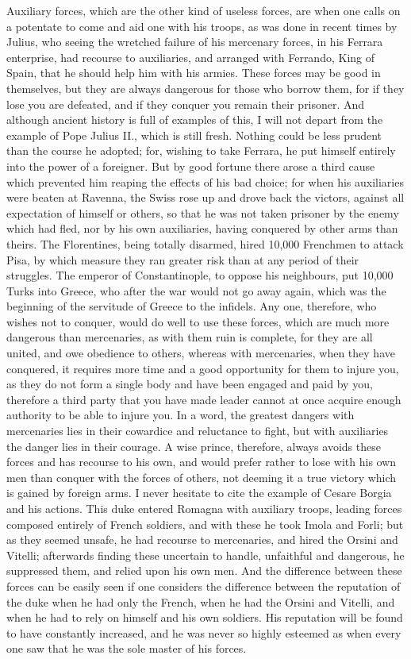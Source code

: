\documentclass[12pt,letterpaper]{memoir}
\begin{document}
Auxiliary forces, which are the other kind of useless forces, are
when one calls on a potentate to come and aid one with his troops, as
was done in recent times by Julius, who seeing the wretched failure
of his mercenary forces, in his Ferrara enterprise, had recourse to
auxiliaries, and arranged with Ferrando, King of Spain, that he should
help him with his armies. These forces may be good in themselves, but
they are always dangerous for those who borrow them, for if they lose
you are defeated, and if they conquer you remain their prisoner. And
although ancient history is full of examples of this, I will not depart
from the example of Pope Julius II., which is still fresh. Nothing
could be less prudent than the course he adopted; for, wishing to take
Ferrara, he put himself entirely into the power of a foreigner. But
by good fortune there arose a third cause which prevented him reaping
the effects of his bad choice; for when his auxiliaries were beaten
at Ravenna, the Swiss rose up and drove back the victors, against all
expectation of himself or others, so that he was not taken prisoner by
the enemy which had fled, nor by his own auxiliaries, having conquered
by other arms than theirs. The Florentines, being totally disarmed,
hired 10,000 Frenchmen to attack Pisa, by which measure they ran
greater risk than at any period of their struggles. The emperor of
Constantinople, to oppose his neighbours, put 10,000 Turks into Greece,
who after the war would not go away again, which was the beginning of
the servitude of Greece to the infidels. Any one, therefore, who wishes
not to conquer, would do well to use these forces, which are much more
dangerous than mercenaries, as with them ruin is complete, for they
are all united, and owe obedience to others, whereas with mercenaries,
when they have conquered, it requires more time and a good opportunity
for them to injure you, as they do not form a single body and have been
engaged and paid by you, therefore a third party that you have made
leader cannot at once acquire enough authority to be able to injure
you. In a word, the greatest dangers with mercenaries lies in their
cowardice and reluctance to fight, but with auxiliaries the danger
lies in their courage. A wise prince, therefore, always avoids these
forces and has recourse to his own, and would prefer rather to lose
with his own men than conquer with the forces of others, not deeming
it a true victory which is gained by foreign arms. I never hesitate to
cite the example of Cesare Borgia and his actions. This duke entered
Romagna with auxiliary troops, leading forces composed entirely of
French soldiers, and with these he took Imola and Forli; but as they
seemed unsafe, he had recourse to mercenaries, and hired the Orsini and
Vitelli; afterwards finding these uncertain to handle, unfaithful and
dangerous, he suppressed them, and relied upon his own men. And the
difference between these forces can be easily seen if one considers
the difference between the reputation of the duke when he had only the
French, when he had the Orsini and Vitelli, and when he had to rely
on himself and his own soldiers. His reputation will be found to have
constantly increased, and he was never so highly esteemed as when
every one saw that he was the sole master of his forces.
\end{document}
